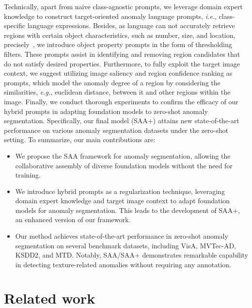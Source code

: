 \documentclass{article}
\begin{document}
Technically, apart from naive class-agnostic prompts, we leverage domain expert knowledge to construct target-oriented anomaly language prompts, \textit{i.e.}, class-specific language expressions. Besides, as language can not accurately retrieve regions with certain object characteristics, such as number, size, and location, precisely~\cite{paiss_count_2023,li2022r}, we introduce object property prompts in the form of thresholding filters. These prompts assist in identifying and removing region candidates that do not satisfy desired properties. Furthermore, to fully exploit the target image context, we suggest utilizing image saliency and region confidence ranking as prompts, which model the anomaly degree of a region by considering the similarities, \textit{e.g.}, euclidean distance, between it and other regions within the image. Finally, we conduct thorough experiments to confirm the efficacy of our hybrid prompts in adapting foundation models to zero-shot anomaly segmentation. Specifically, our final model (SAA$+$) attains new state-of-the-art performance on various anomaly segmentation datasets under the zero-shot setting.
To summarize, our main contributions are:
\begin{itemize}
    \item We propose the SAA framework for anomaly segmentation, allowing the collaborative assembly of diverse foundation models without the need for training.
    \item We introduce hybrid prompts as a regularization technique, leveraging domain expert knowledge and target image context to adapt foundation models for anomaly segmentation. This leads to the development of SAA$+$, an enhanced version of our framework.
    \item Our method achieves state-of-the-art performance in zero-shot anomaly segmentation on several benchmark datasets, including VisA, MVTec-AD, KSDD2, and MTD. Notably, SAA/SAA$+$ demonstrates remarkable capability in detecting texture-related anomalies without requiring any annotation.
\end{itemize}







\section{Related work}
\label{sec:related_work}
\end{document}
